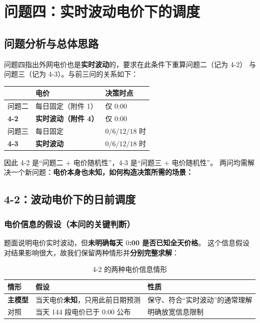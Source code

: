 ﻿%
\section{问题四：实时波动电价下的调度}

\subsection{问题分析与总体思路}

问题四指出外网电价也是\textbf{实时波动}的，要求在此条件下重算问题二（记为 4-2）
与问题三（记为 4-3）。与前三问的关系如下：

\begin{center}
\begin{tabular}{@{}l l l@{}}
\toprule
 & 电价 & 决策时点 \\
\midrule
问题二  & 每日固定（附件 1）    & 仅 $0$:00 \\
\textbf{4-2} & \textbf{实时波动（附件 4）} & 仅 $0$:00 \\
问题三  & 每日固定              & $0/6/12/18$ 时 \\
\textbf{4-3} & \textbf{实时波动}      & $0/6/12/18$ 时 \\
\bottomrule
\end{tabular}
\end{center}

因此 4-2 是“问题二 $+$ 电价随机性”，4-3 是“问题三 $+$ 电价随机性”。
两问均需解决一个新问题：\textbf{电价本身也未知，如何构造决策所需的场景：}

\subsection{4-2：波动电价下的日前调度}

\subsubsection{电价信息的假设（本问的关键判断）}

题面说明电价实时波动，但\textbf{未明确每天 $0$:00 是否已知全天价格}。
这个信息假设对结果影响很大，故我们保留两种情形并\textbf{分别完整求解}：

\begin{table}[H]
\centering
\caption{4-2 的两种电价信息情形}
\begin{tabular}{@{}l l l@{}}
\toprule
情形 & 假设 & 性质 \\
\midrule
\textbf{主模型} & 当天电价\textbf{未知}，只用此前日期预测 & 保守、符合“实时波动”的通常理解 \\
对照         & 当天 144 段电价已于 $0$:00 公布 & 明确放宽信息限制 \\
\bottomrule
\end{tabular}
\end{table}

